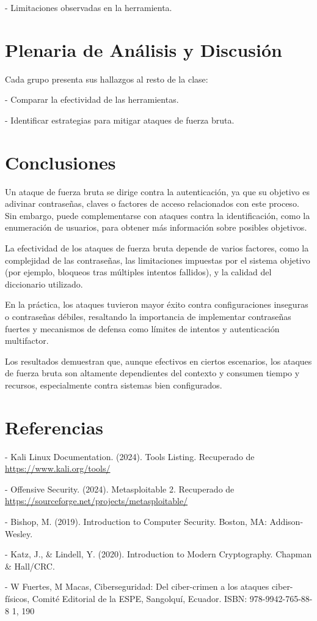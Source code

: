 \documentclass[12pt,a4paper]{article}
\begin{document}
- Limitaciones observadas en la herramienta.


\section*{Plenaria de Análisis y Discusión}
Cada grupo presenta sus hallazgos al resto de la clase:

    
- Comparar la efectividad de las herramientas.
    
- Identificar estrategias para mitigar ataques de fuerza bruta.


\section*{Conclusiones}
Un ataque de fuerza bruta se dirige contra la autenticación, ya que su objetivo es adivinar contraseñas, claves o factores de acceso relacionados con este proceso. Sin embargo, puede complementarse con ataques contra la identificación, como la enumeración de usuarios, para obtener más información sobre posibles objetivos.

La efectividad de los ataques de fuerza bruta depende de varios factores, como la complejidad de las contraseñas, las limitaciones impuestas por el sistema objetivo (por ejemplo, bloqueos tras múltiples intentos fallidos), y la calidad del diccionario utilizado.

En la práctica, los ataques tuvieron mayor éxito contra configuraciones inseguras o contraseñas débiles, resaltando la importancia de implementar contraseñas fuertes y mecanismos de defensa como límites de intentos y autenticación multifactor.

Los resultados demuestran que, aunque efectivos en ciertos escenarios, los ataques de fuerza bruta son altamente dependientes del contexto y consumen tiempo y recursos, especialmente contra sistemas bien configurados.

\section*{Referencias}

    
- Kali Linux Documentation. (2024). Tools Listing. Recuperado de \url{https://www.kali.org/tools/}
    
- Offensive Security. (2024). Metasploitable 2. Recuperado de \url{https://sourceforge.net/projects/metasploitable/}
    
- Bishop, M. (2019). Introduction to Computer Security. Boston, MA: Addison-Wesley.
    
- Katz, J., \& Lindell, Y. (2020). Introduction to Modern Cryptography. Chapman \& Hall/CRC.
    
- W Fuertes, M Macas, Ciberseguridad: Del ciber-crimen a los ataques ciber-físicos, Comité Editorial de la ESPE, Sangolquí, Ecuador. ISBN: 978-9942-765-88-8 1, 190
\end{document}
